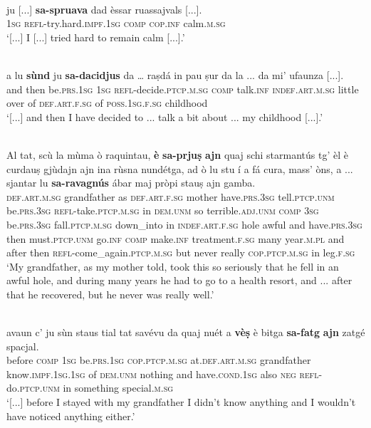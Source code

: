 \ea\label{ex:refessar1}
\\
\gll [...] ju [...] \textbf{sa-spruava} dad èssar ruassajvals [...].\\
{} \textsc{1sg} {}  \textsc{refl-}try.hard.\textsc{impf.1sg} \textsc{comp} \textsc{cop.inf} calm.\textsc{m.sg}\\
\glt `[...] I [...] tried hard to remain calm [...].'
\z

\ea\label{ex:refessar2}
\\
\gll [...] a lu \textbf{sùnd} ju \textbf{sa-dacidjus} da … raṣdá in pau ṣur da la ... da mi’ ufaunza [...].   \\
{} and then  be.\textsc{prs.1sg}  \textsc{1sg}  \textsc{refl}-decide.\textsc{ptcp.m.sg}  \textsc{comp} {} talk.\textsc{inf} \textsc{indef.art.m.sg} little over of  \textsc{def.art.f.sg} {} of \textsc{poss.1sg.f.sg} childhood\\
\glt `[...] and then I have decided to ... talk a bit about ... my childhood [...].'
\z

\ea\label{ex:refessar3}
\\
\gll  Al tat, scù la mùma ò raquintau, \textbf{è}  \textbf{sa-prjuṣ} \textbf{ajn} quaj schi starmantús tg’ èl è curdauṣ gjùdajn ajn ina rùsna nundétga, ad ò lu stu í a fá cura, mass’ òns, a ... sjantar lu  \textbf{sa-ravagnús} ábar maj pròpi stauṣ ajn gamba.  \\
\textsc{def.art.m.sg} grandfather as  \textsc{def.art.f.sg} mother have.\textsc{prs.3sg} tell.\textsc{ptcp.unm} be.\textsc{prs.3sg} \textsc{refl-}take.\textsc{ptcp.m.sg} in \textsc{dem.unm} so terrible.\textsc{adj.unm} \textsc{comp} \textsc{3sg} be.\textsc{prs.3sg} fall.\textsc{ptcp.m.sg} down\_into in \textsc{indef.art.f.sg} hole awful and have.\textsc{prs.3sg} then must.\textsc{ptcp.unm} go.\textsc{inf} \textsc{comp} make.\textsc{inf} treatment.\textsc{f.sg} many year.\textsc{m.pl} and {} after then \textsc{refl}-come\_again.\textsc{ptcp.m.sg} but never really \textsc{cop.ptcp.m.sg} in leg.\textsc{f.sg}\\
\glt `My grandfather, as my mother told, took this so seriously that he fell in an awful hole, and during many years he had to go to a health resort, and ... after that he recovered, but he never was really well.'
\z

\ea\label{ex:refvaj1}
\\
\gll  [...] avaun c’ ju sùn staus tial tat savévu da quaj nuét a \textbf{vèṣ} è bitga \textbf{sa-fatg} \textbf{ajn} zatgé spacjal.\\
{} before \textsc{comp} \textsc{1sg} be.\textsc{prs.1sg} \textsc{cop.ptcp.m.sg} at.\textsc{def.art.m.sg} grandfather know.\textsc{impf.1sg.1sg} of \textsc{dem.unm} nothing and have.\textsc{cond.1sg} also \textsc{neg} \textsc{refl-}do.\textsc{ptcp.unm} in something special.\textsc{m.sg}\\
\glt `[...] before I stayed with my grandfather I didn’t know anything and I wouldn’t have noticed anything either.'
\z

